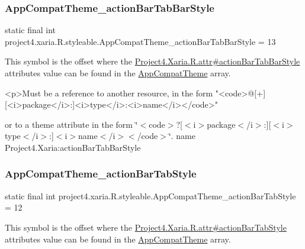 \subsubsection{\texorpdfstring{App\+Compat\+Theme\+\_\+action\+Bar\+Tab\+Bar\+Style}{AppCompatTheme\_actionBarTabBarStyle}}
{\footnotesize\ttfamily static final int project4.\+xaria.\+R.\+styleable.\+App\+Compat\+Theme\+\_\+action\+Bar\+Tab\+Bar\+Style = 13\hspace{0.3cm}{\ttfamily [static]}}

This symbol is the offset where the \hyperlink{}{Project4.\+Xaria.\+R.\+attr\#action\+Bar\+Tab\+Bar\+Style} attribute\textquotesingle{}s value can be found in the \hyperlink{classproject4_1_1xaria_1_1R_1_1styleable_aad8bec413e2350f9404e6ff0e831a85d}{App\+Compat\+Theme} array.

\begin{DoxyVerb}      <p>Must be a reference to another resource, in the form "<code>@[+][<i>package</i>:]<i>type</i>:<i>name</i></code>"
\end{DoxyVerb}
 or to a theme attribute in the form \char`\"{}$<$code$>$?\mbox{[}$<$i$>$package$<$/i$>$\+:\mbox{]}\mbox{[}$<$i$>$type$<$/i$>$\+:\mbox{]}$<$i$>$name$<$/i$>$$<$/code$>$\char`\"{}.  name Project4.\+Xaria\+:action\+Bar\+Tab\+Bar\+Style \mbox{\label{classproject4_1_1xaria_1_1R_1_1styleable_ac191cc6e34d8b07e8c5375d0e9060ad5}} 
\subsubsection{\texorpdfstring{App\+Compat\+Theme\+\_\+action\+Bar\+Tab\+Style}{AppCompatTheme\_actionBarTabStyle}}
{\footnotesize\ttfamily static final int project4.\+xaria.\+R.\+styleable.\+App\+Compat\+Theme\+\_\+action\+Bar\+Tab\+Style = 12\hspace{0.3cm}{\ttfamily [static]}}

This symbol is the offset where the \hyperlink{}{Project4.\+Xaria.\+R.\+attr\#action\+Bar\+Tab\+Style} attribute\textquotesingle{}s value can be found in the \hyperlink{classproject4_1_1xaria_1_1R_1_1styleable_aad8bec413e2350f9404e6ff0e831a85d}{App\+Compat\+Theme} array.

